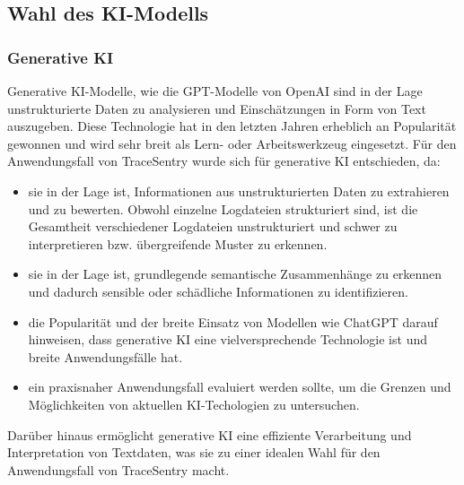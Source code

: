 \documentclass[a4paper,12pt]{report}
\begin{document}
    \subsection{Wahl des KI-Modells}\label{subsec:wahl-des-ki-modells}
    \subsubsection{Generative KI}\label{subsubsec:generative-ki}
    Generative KI-Modelle, wie die GPT-Modelle von OpenAI sind in der Lage unstrukturierte Daten zu analysieren und Einschätzungen in Form von Text auszugeben.
    Diese Technologie hat in den letzten Jahren erheblich an Popularität gewonnen und wird sehr breit als Lern- oder Arbeitswerkzeug eingesetzt.
    Für den Anwendungsfall von TraceSentry wurde sich für generative KI entschieden, da:
    \begin{itemize}
        \item sie in der Lage ist, Informationen aus unstrukturierten Daten zu extrahieren und zu bewerten.
        Obwohl einzelne Logdateien strukturiert sind, ist die Gesamtheit verschiedener Logdateien unstrukturiert und schwer zu interpretieren bzw. übergreifende Muster zu erkennen.
        \item sie in der Lage ist, grundlegende semantische Zusammenhänge zu erkennen und dadurch sensible oder schädliche Informationen zu identifizieren.
        \item die Popularität und der breite Einsatz von Modellen wie ChatGPT darauf hinweisen, dass generative KI eine vielversprechende Technologie ist und breite Anwendungsfälle hat.
        \item ein praxisnaher Anwendungsfall evaluiert werden sollte, um die Grenzen und Möglichkeiten von aktuellen KI-Techologien zu untersuchen.
    \end{itemize}
    Darüber hinaus ermöglicht generative KI eine effiziente Verarbeitung und Interpretation von Textdaten, was sie zu einer idealen Wahl für den Anwendungsfall von TraceSentry macht.
\end{document}
